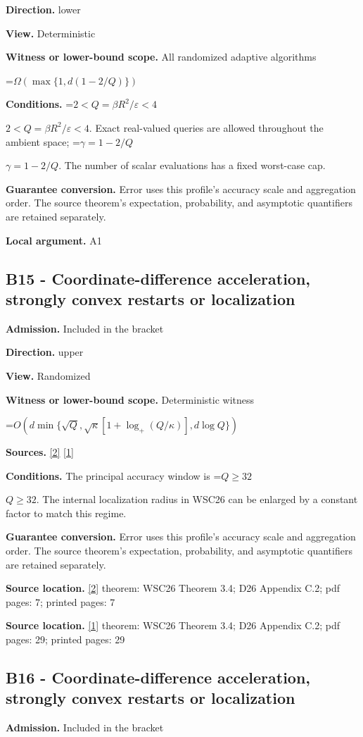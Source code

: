 \documentclass[10pt,a4paper]{article}
\newcommand{\AtlasMath}[1]{\par\begingroup\centering\setbox0=\hbox{$\displaystyle #1$}\ifdim\wd0>1.4\linewidth\typeout{ATLAS WIDE FORMULA: \the\wd0}\fi\ifdim\wd0>\linewidth\resizebox{\linewidth}{!}{\box0}\else\box0\fi\par\endgroup}
\newcommand{\AtlasInlineMath}[1]{\begingroup\setbox0=\hbox{$#1$}\ifdim\wd0>.4\linewidth\endgroup\AtlasMath{#1}\else\endgroup$#1$\fi}
\begin{document}
\textbf{Direction.} lower

\textbf{View.} Deterministic

\textbf{Witness or lower-bound scope.} All randomized adaptive algorithms

\AtlasMath{\Omega(\max\{1,d(1-2/Q)\})}
\textbf{Conditions.} \AtlasInlineMath{2<Q=\beta R^2/\varepsilon<4}. Exact real-valued queries are allowed throughout the ambient space; \AtlasInlineMath{\gamma=1-2/Q}. The number of scalar evaluations has a fixed worst-case cap.

\textbf{Guarantee conversion.} Error uses this profile's accuracy scale and aggregation order. The source theorem's expectation, probability, and asymptotic quantifiers are retained separately.

\textbf{Local argument.} A1

\subsection{B15 - Coordinate-difference acceleration, strongly convex restarts or localization}
\textbf{Admission.} Included in the bracket

\textbf{Direction.} upper

\textbf{View.} Randomized

\textbf{Witness or lower-bound scope.} Deterministic witness

\AtlasMath{O\!\left(d\min\{\sqrt Q,\sqrt\kappa[1+\log_+(Q/\kappa)],d\log Q\}\right)}
\textbf{Sources.} \href{https://arxiv.org/pdf/2609.18728v2}{[2]} \href{https://arxiv.org/html/2610.00345v1}{[1]}

\textbf{Conditions.} The principal accuracy window is \AtlasInlineMath{Q\ge32}. The internal localization radius in WSC26 can be enlarged by a constant factor to match this regime.

\textbf{Guarantee conversion.} Error uses this profile's accuracy scale and aggregation order. The source theorem's expectation, probability, and asymptotic quantifiers are retained separately.

\textbf{Source location.} \href{https://arxiv.org/pdf/2609.18728v2}{[2]} theorem: WSC26 Theorem 3.4; D26 Appendix C.2; pdf pages: 7; printed pages: 7

\textbf{Source location.} \href{https://arxiv.org/html/2610.00345v1}{[1]} theorem: WSC26 Theorem 3.4; D26 Appendix C.2; pdf pages: 29; printed pages: 29

\subsection{B16 - Coordinate-difference acceleration, strongly convex restarts or localization}
\textbf{Admission.} Included in the bracket
\end{document}
